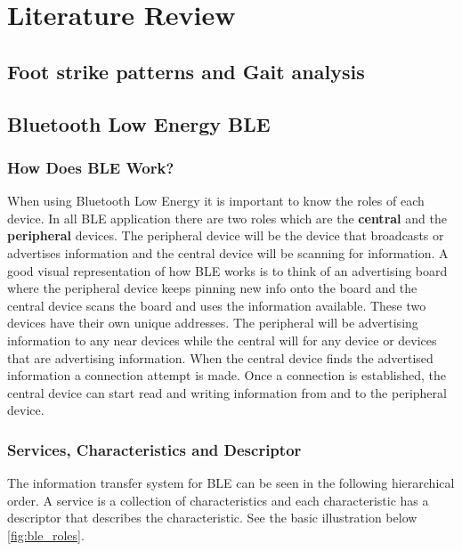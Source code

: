 \graphicspath{{litreview/fig/}}

\chapter{Literature Review}
\label{chap:litreview}
\section{Foot strike patterns and Gait analysis}
\label{sec:Gait}



\section{Bluetooth Low Energy BLE}
\label{sec:ble}

\subsection{How Does BLE Work?}
\label{sec:howdoesblework}

When using Bluetooth Low Energy it is important to know the roles of each device. In all BLE application there are two roles which are the \textbf{central} and the \textbf{peripheral} devices. The peripheral device will be the device that broadcasts or advertises information and the central device will be scanning for information. A good visual representation of how BLE works is to think of an advertising board where the peripheral device keeps pinning new info onto the board and the central device scans the board and uses the information available. These two devices have their own unique addresses. The peripheral will be advertising information to any near devices while the central will for any device or devices that are advertising information. When the central device finds the advertised information a connection attempt is made. Once a connection is established, the central device can start read and writing information from and to the peripheral device.

\subsection{Services, Characteristics and Descriptor}
\label{sec:servicesandcharacteristics}
 The information transfer system for BLE can be seen in the following hierarchical order. A service is a collection of characteristics and each characteristic has a descriptor that describes the characteristic. See the basic illustration below \ref{fig:ble_roles}.

